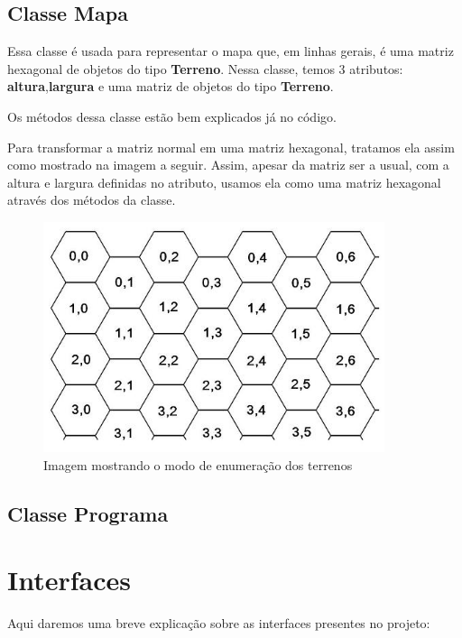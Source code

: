 \documentclass[11pt]{article}
\begin{document}
\subsection{Classe Mapa}

Essa classe é usada para representar o mapa que, em linhas gerais, é uma matriz hexagonal de objetos do tipo \textbf{\color{red}Terreno}. Nessa classe, temos 3 atributos: \textbf{\color{red}altura},\textbf{\color{red}largura} e uma matriz de objetos do tipo \textbf{\color{red}Terreno}.

Os métodos dessa classe estão bem explicados já no código.

Para transformar a matriz normal em uma matriz hexagonal, tratamos ela assim como mostrado na imagem a seguir. Assim, apesar da matriz ser a usual, com a altura e largura definidas no atributo, usamos ela como uma matriz hexagonal através dos métodos da classe.

\begin{figure}[h]

    \center

    \includegraphics[width=10cm]{hex_array.jpg}

    \label{hexmatrix}

    \caption{Imagem mostrando o modo de enumeração dos terrenos}

\end{figure}

\subsection{Classe Programa}

\section{Interfaces}

Aqui daremos uma breve explicação sobre as interfaces presentes no projeto:
\end{document}
